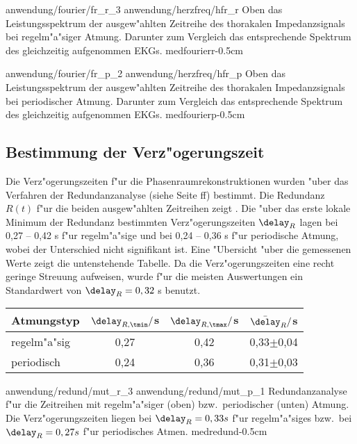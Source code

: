 \epsfigdouble
{anwendung/fourier/fr_r_3}
{anwendung/herzfreq/hfr_r}
{Oben das Leistungsspektrum der ausgew"ahlten Zeitreihe des thorakalen Impedanzsignals bei regelm"a"siger Atmung.
  Darunter zum Vergleich das entsprechende Spektrum  des gleichzeitig aufgenommen EKGs.
}
{medfourierr}{-0.5cm}

\epsfigdouble
{anwendung/fourier/fr_p_2}
{anwendung/herzfreq/hfr_p}
{Oben das Leistungsspektrum der ausgew"ahlten Zeitreihe des thorakalen Impedanzsignals bei
  periodischer Atmung.
  Darunter zum Vergleich das entsprechende Spektrum  des gleichzeitig aufgenommen EKGs.
}
{medfourierp}{-0.5cm}


\subsection{Bestimmung der Verz"ogerungszeit}
Die Verz"ogerungszeiten f"ur die Phasenraumrekonstruktionen wurden "uber das Verfahren der
Redundanzanalyse (siehe Seite \pageref{chapredundancy}ff) bestimmt. Die Redundanz $R(t)$
f"ur die beiden ausgew"ahlten Zeitreihen zeigt .  Die "uber das erste
lokale Minimum der Redundanz bestimmten Verz"ogerungszeiten $\delay_R$
lagen bei 0,27 -- 0,42 s f"ur regelm"a"sige und bei 0,24 -- 0,36 s f"ur periodische Atmung,
wobei der Unterschied nicht signifikant ist. Eine "Ubersicht "uber die gemessenen Werte
zeigt die untenstehende Tabelle. Da die Verz"ogerungszeiten eine recht geringe Streuung
aufweisen, wurde f"ur die meisten Auswertungen ein Standardwert von $\delay_R=0,32$ s
benutzt. 

\begin{center}
\begin{tabular}{|l||c|c|c|}
  \hline
  Atmungstyp & $\delay_{R,\tmin}/$s & $\delay_{R,\tmax}/$s & $\bar \delay_{R}/$s \\
  \hline
  regelm"a"sig   &  0,27 &  0,42   &  0,33$\pm$0,04 \\
  periodisch        &  0,24 &  0,36   &  0,31$\pm$0,03 \\
  \hline
\end{tabular}
\end{center}

\epsfigdouble
{anwendung/redund/mut_r_3}
{anwendung/redund/mut_p_1}
{Redundanzanalyse f"ur die Zeitreihen mit regelm"a"siger (oben) bzw.\  periodischer
  (unten) Atmung. Die Verz"ogerungszeiten
  liegen bei $\delay_R=0,33 s$ f"ur regelm"a"siges bzw.\ bei $\delay_R=0,27 s$ f"ur
  periodisches Atmen. 
}
{medredund}{-0.5cm}

\clearpage
